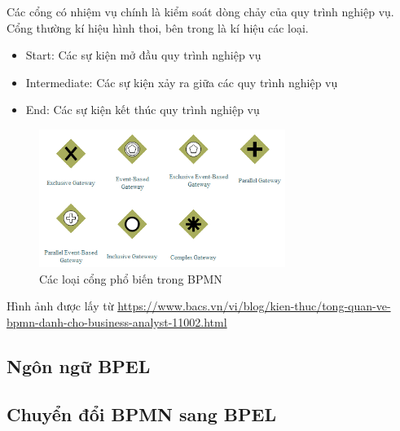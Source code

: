 Các cổng có nhiệm vụ chính là kiểm soát dòng chảy của quy trình nghiệp vụ. Cổng thường kí hiệu hình thoi, bên trong là kí hiệu các loại.
\begin{itemize}
	\item Start: Các sự kiện mở đầu quy trình nghiệp vụ
	\item Intermediate: Các sự kiện xảy ra giữa các quy trình nghiệp vụ
	\item End: Các sự kiện kết thúc quy trình nghiệp vụ
\end{itemize}
\begin{figure}[!htp]
	\begin{center}
		\includegraphics[width=8cm]{img/theory/BPMN/Gateway.png}
	\end{center}
	\caption{Các loại cổng phổ biến trong BPMN}
\end{figure}
\begin{flushleft}
	Hình ảnh được lấy từ \url{https://www.bacs.vn/vi/blog/kien-thuc/tong-quan-ve-bpmn-danh-cho-business-analyst-11002.html}
\end{flushleft}



\subsection{Ngôn ngữ BPEL}

\subsection{Chuyển đổi BPMN sang BPEL}